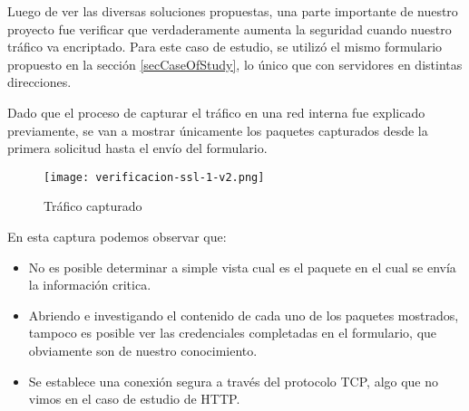 Luego de ver las diversas soluciones propuestas, una parte importante de 
nuestro proyecto fue verificar que verdaderamente aumenta la seguridad
cuando nuestro tráfico va encriptado. Para este caso de estudio, se utilizó
el mismo formulario propuesto en la sección \ref{secCaseOfStudy}, lo 
único que con servidores en distintas direcciones.

Dado que el proceso de capturar el tráfico en una red interna fue
explicado previamente, se van a mostrar únicamente los paquetes capturados
desde la primera solicitud hasta el envío del formulario.

\begin{center}
   \begin{figure}   
      \begin{center}
         \texttt{[image: verificacion-ssl-1-v2.png]}
      \end{center}
      \caption{Tráfico capturado}
   \end{figure}
\end{center}

En esta captura podemos observar que:
\begin{itemize}
   \setlength\itemsep{-0.6em}
   \item No es posible determinar a simple vista cual es el paquete 
   en el cual se envía la información critica.
   \item Abriendo e investigando el contenido de cada uno de los paquetes mostrados,
   tampoco es posible ver las credenciales completadas en el formulario, 
   que obviamente son de nuestro conocimiento.
   \item Se establece una conexión segura a través del protocolo TCP, algo que no 
   vimos en el caso de estudio de HTTP.
\end{itemize}


